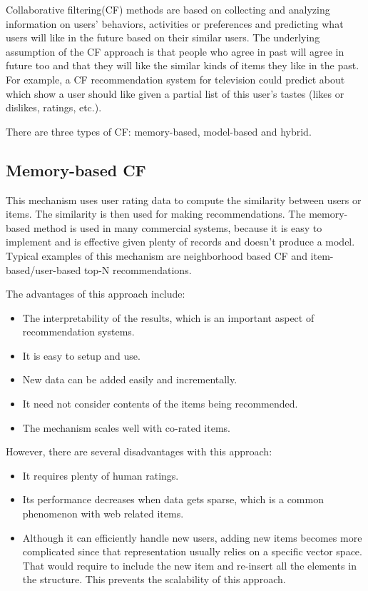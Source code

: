 Collaborative filtering(CF) methods are based on collecting and analyzing information on users' behaviors, activities or preferences and predicting what users will like in the future based on their similar users. The underlying assumption of the CF approach is that people who agree in past will agree in future too and that they will like the similar kinds of items they like in the past. For example, a CF recommendation system for television could predict about which show a user should like given a partial list of this user's tastes (likes or dislikes, ratings, etc.).

There are three types of CF: memory-based, model-based and hybrid.

\hspace{0.05in}
\subsection{Memory-based CF}
This mechanism uses user rating data to compute the similarity between users or items. The similarity is then used for making recommendations. The memory-based method is used in many commercial systems, because it is easy to implement and is effective given plenty of records and doesn't produce a model. Typical examples of this mechanism are neighborhood based CF and item-based/user-based top-N recommendations\cite{su2009survey}.

The advantages of this approach include:
\begin{itemize}
\item The interpretability of the results, which is an important aspect of recommendation systems.
\item It is easy to setup and use.
\item New data can be added easily and incrementally.
\item It need not consider contents of the items being recommended.
\item The mechanism scales well with co-rated items.
\end{itemize}

However, there are several disadvantages with this approach:
\begin{itemize}
\item It requires plenty of human ratings.
\item Its performance decreases when data gets sparse, which is a common phenomenon with web related items.
\item Although it can efficiently handle new users, adding new items becomes more complicated since that representation usually relies on a specific vector space. That would require to include the new item and re-insert all the elements in the structure. This prevents the scalability of this approach.
\end{itemize}


